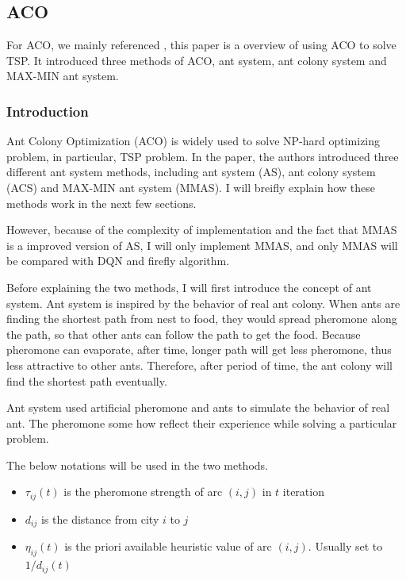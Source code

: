 \documentclass[twocolumn, a4paper]{extarticle}
\begin{document}
\subsection{ACO}

For ACO, we mainly referenced \cite{stutzle1999aco}, this paper is a overview of using ACO to solve TSP. It introduced three methods of ACO, ant system, ant colony system and MAX-MIN ant system.

\subsubsection{Introduction}
Ant Colony Optimization (ACO) is widely used to solve NP-hard optimizing problem, in particular, TSP problem. In the paper, the authors introduced three different ant system methods, including ant system (AS), ant colony system (ACS) and MAX-MIN ant system (MMAS). I will breifly explain how these methods work in the next few sections.

However, because of the complexity of implementation and the fact that MMAS is a improved version of AS, I will only implement MMAS, and only MMAS will be compared with DQN and firefly algorithm.

Before explaining the two methods, I will first introduce the concept of ant system. Ant system is inspired by the behavior of real ant colony. When ants are finding the shortest path from nest to food, they would spread pheromone along the path, so that other ants can follow the path to get the food. Because pheromone can evaporate, after time, longer path will get less pheromone, thus less attractive to other ants. Therefore, after period of time, the ant colony will find the shortest path eventually. 

Ant system used artificial pheromone and ants to simulate the behavior of real ant. The pheromone some how reflect their experience while solving a particular problem.

The below notations will be used in the two methods.

\begin{itemize}
	\item $\tau_{ij}(t)$ is the pheromone strength of arc $(i, j)$ in $t$ iteration
	\item $d_{ij}$ is the distance from city $i$ to $j$
	\item $\eta_{ij}(t)$ is the priori available heuristic value of arc $(i, j)$. Usually set to $1/d_{ij}(t)$
\end{itemize}
\end{document}
